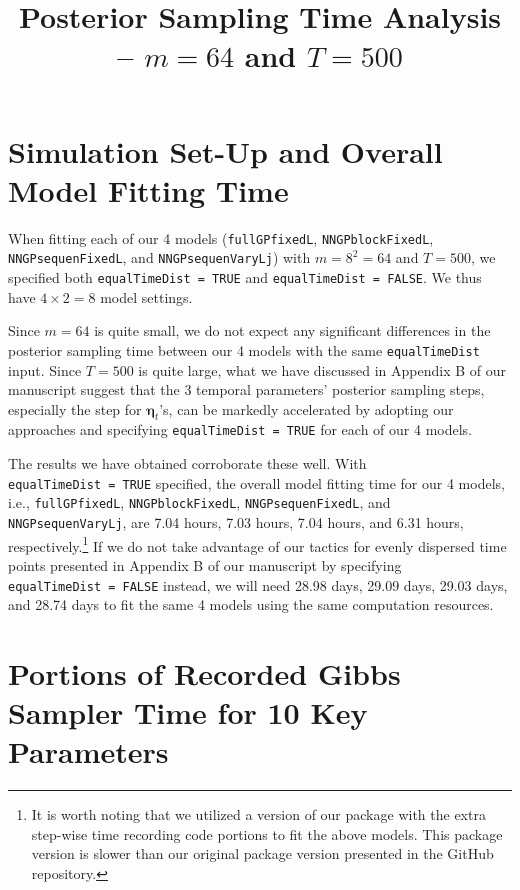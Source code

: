 \documentclass[
]{article}
\title{Posterior Sampling Time Analysis -- \(m=64\) and \(T=500\)}
\author{}
\date{\vspace{-2.5em}}
\begin{document}
\maketitle

\hypertarget{simulation-set-up-and-overall-model-fitting-time}{%
\section{Simulation Set-Up and Overall Model Fitting
Time}\label{simulation-set-up-and-overall-model-fitting-time}}

When fitting each of our 4 models (\texttt{fullGPfixedL},
\texttt{NNGPblockFixedL}, \texttt{NNGPsequenFixedL}, and
\texttt{NNGPsequenVaryLj}) with \(m=8^2=64\) and \(T=500\), we specified
both \texttt{equalTimeDist\ =\ TRUE} and
\texttt{equalTimeDist\ =\ FALSE}. We thus have \(4\times 2 = 8\) model
settings.

Since \(m=64\) is quite small, we do not expect any significant
differences in the posterior sampling time between our 4 models with the
same \texttt{equalTimeDist} input. Since \(T=500\) is quite large, what
we have discussed in Appendix B of our manuscript suggest that the 3
temporal parameters' posterior sampling steps, especially the step for
\(\bm{\eta}_t\)'s, can be markedly accelerated by adopting our
approaches and specifying \texttt{equalTimeDist\ =\ TRUE} for each of
our 4 models.

The results we have obtained corroborate these well. With
\texttt{equalTimeDist\ =\ TRUE} specified, the overall model fitting
time for our 4 models, i.e., \texttt{fullGPfixedL},
\texttt{NNGPblockFixedL}, \texttt{NNGPsequenFixedL}, and
\texttt{NNGPsequenVaryLj}, are 7.04 hours, 7.03 hours, 7.04 hours, and
6.31 hours, respectively.\footnote{It is worth noting that we utilized a
  version of our package with the extra step-wise time recording code
  portions to fit the above models. This package version is slower than
  our original package version presented in the GitHub repository.} If
we do not take advantage of our tactics for evenly dispersed time points
presented in Appendix B of our manuscript by specifying
\texttt{equalTimeDist\ =\ FALSE} instead, we will need 28.98 days, 29.09
days, 29.03 days, and 28.74 days to fit the same 4 models using the same
computation resources.

\hypertarget{portions-of-recorded-gibbs-sampler-time-for-10-key-parameters}{%
\section{Portions of Recorded Gibbs Sampler Time for 10 Key
Parameters}\label{portions-of-recorded-gibbs-sampler-time-for-10-key-parameters}}
\end{document}
